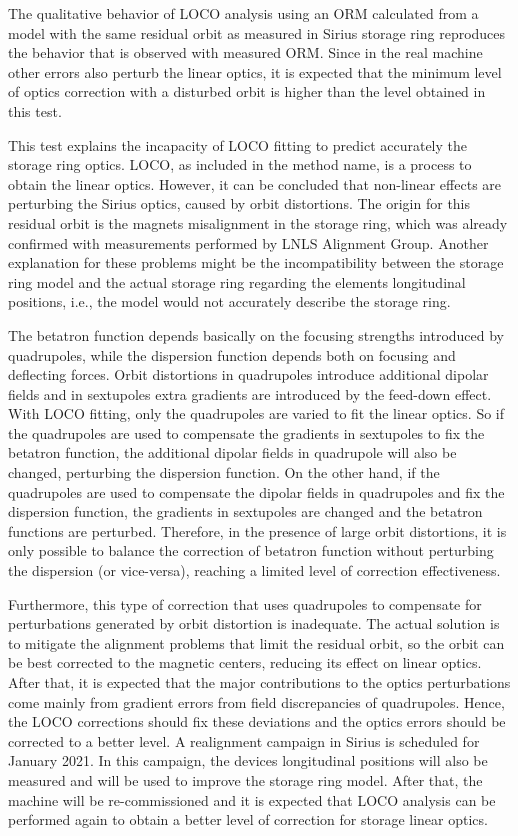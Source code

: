 The qualitative behavior of LOCO analysis using an ORM calculated from a model with the same residual orbit as measured in Sirius storage ring reproduces the behavior that is observed with measured ORM. Since in the real machine other errors also perturb the linear optics, it is expected that the minimum level of optics correction with a disturbed orbit is higher than the level obtained in this test. 

This test explains the incapacity of LOCO fitting to predict accurately the storage ring optics. LOCO, as included in the method name, is a process to obtain the linear optics. However, it can be concluded that non-linear effects are perturbing the Sirius optics, caused by orbit distortions. The origin for this residual orbit is the magnets misalignment in the storage ring, which was already confirmed with measurements performed by LNLS Alignment Group. Another explanation for these problems might be the incompatibility between the storage ring model and the actual storage ring regarding the elements longitudinal positions, i.e., the model would not accurately describe the storage ring. 

The betatron function depends basically on the focusing strengths introduced by quadrupoles, while the dispersion function depends both on focusing and deflecting forces. Orbit distortions in quadrupoles introduce additional dipolar fields and in sextupoles extra gradients are introduced by the feed-down effect. With LOCO fitting, only the quadrupoles are varied to fit the linear optics. So if the quadrupoles are used to compensate the gradients in sextupoles to fix the betatron function, the additional dipolar fields in quadrupole will also be changed, perturbing the dispersion function. On the other hand, if the quadrupoles are used to compensate the dipolar fields in quadrupoles and fix the dispersion function, the gradients in sextupoles are changed and the betatron functions are perturbed. Therefore, in the presence of large orbit distortions, it is only possible to balance the correction of betatron function without perturbing the dispersion (or vice-versa), reaching a limited level of correction effectiveness.

Furthermore, this type of correction that uses quadrupoles to compensate for perturbations generated by orbit distortion is inadequate. The actual solution is to mitigate the alignment problems that limit the residual orbit, so the orbit can be best corrected to the magnetic centers, reducing its effect on linear optics. After that, it is expected that the major contributions to the optics perturbations come mainly from gradient errors from field discrepancies of quadrupoles. Hence, the LOCO corrections should fix these deviations and the optics errors should be corrected to a better level. A realignment campaign in Sirius is scheduled for January 2021. In this campaign, the devices longitudinal positions will also be measured and will be used to improve the storage ring model. After that, the machine will be re-commissioned and it is expected that LOCO analysis can be performed again to obtain a better level of correction for storage linear optics.
